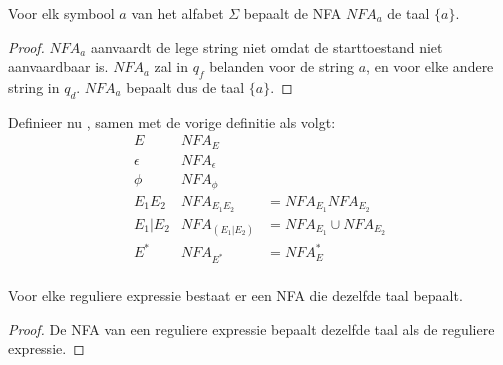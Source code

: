 \documentclass[main.tex]{subfiles}
\begin{document}
\begin{ei}
  \label{ei:nfa-a}
  Voor elk symbool $a$ van het alfabet $\Sigma$ bepaalt de NFA $NFA_{a}$ de taal $\{ a \}$.

  \begin{proof}
    $NFA_{a}$ aanvaardt de lege string niet omdat de starttoestand niet aanvaardbaar is.
    $NFA_{a}$ zal in $q_{f}$ belanden voor de string $a$, en voor elke andere string in $q_{d}$.
    $NFA_{a}$ bepaalt dus de taal $\{ a \}$.
  \end{proof}
\end{ei}

\begin{de}
  Definieer nu , samen met de vorige definitie als volgt:
  \[
  \begin{array}{r|ll}
    E & NFA_{E}\\
    \hline
    \epsilon & NFA_{\epsilon}\\
    \phi & NFA_{\phi}\\
    E_{1}E_{2} & NFA_{E_{1}E_{2}} &= NFA_{E_{1}}NFA_{E_{2}}\\
    E_{1}|E_{2} & NFA_{(E_{1}|E_{2})} &= NFA_{E_{1}} \cup NFA_{E_{2}}\\
    E^{*} & NFA_{E^{*}} &= NFA_{E}^{*}\\
  \end{array}
  \]
\end{de}

\begin{st}
  \label{st:regex-naar-NFA}
  Voor elke reguliere expressie bestaat er een NFA die dezelfde taal bepaalt.

  \begin{proof}
    De NFA van een reguliere expressie bepaalt dezelfde taal als de reguliere expressie.       
  \end{proof}
\end{st}
\end{document}
